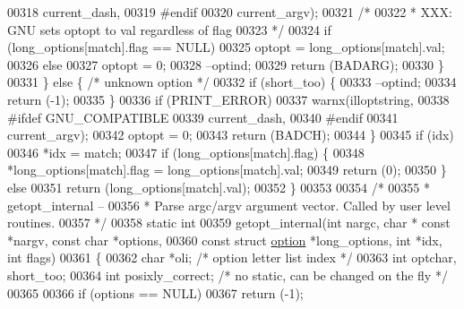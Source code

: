 \begin{DoxyCode}
{{{{{{{{{{{00318                     current\_dash,
00319 #endif
00320                     current\_argv);
00321             \textcolor{comment}{/*}
00322 \textcolor{comment}{             * XXX: GNU sets optopt to val regardless of flag}
00323 \textcolor{comment}{             */}
00324             \textcolor{keywordflow}{if} (long\_options[match].flag == NULL)
00325                 optopt = long\_options[match].val;
00326             \textcolor{keywordflow}{else}
00327                 optopt = 0;
00328             --optind;
00329             \textcolor{keywordflow}{return} (BADARG);
00330         \}
00331     \} \textcolor{keywordflow}{else} \{            \textcolor{comment}{/* unknown option */}
00332         \textcolor{keywordflow}{if} (short\_too) \{
00333             --optind;
00334             \textcolor{keywordflow}{return} (-1);
00335         \}
00336         \textcolor{keywordflow}{if} (PRINT\_ERROR)
00337             warnx(illoptstring,
00338 #ifdef GNU\_COMPATIBLE
00339                   current\_dash,
00340 #endif
00341                   current\_argv);
00342         optopt = 0;
00343         \textcolor{keywordflow}{return} (BADCH);
00344     \}
00345     \textcolor{keywordflow}{if} (idx)
00346         *idx = match;
00347     \textcolor{keywordflow}{if} (long\_options[match].flag) \{
00348         *long\_options[match].flag = long\_options[match].val;
00349         \textcolor{keywordflow}{return} (0);
00350     \} \textcolor{keywordflow}{else}
00351         \textcolor{keywordflow}{return} (long\_options[match].val);
00352 \}
00353 
00354 \textcolor{comment}{/*}
00355 \textcolor{comment}{ * getopt\_internal --}
00356 \textcolor{comment}{ *  Parse argc/argv argument vector.  Called by user level routines.}
00357 \textcolor{comment}{ */}
00358 \textcolor{keyword}{static} \textcolor{keywordtype}{int}
00359 getopt\_internal(\textcolor{keywordtype}{int} nargc, \textcolor{keywordtype}{char} * \textcolor{keyword}{const} *nargv, \textcolor{keyword}{const} \textcolor{keywordtype}{char} *options,
00360     \textcolor{keyword}{const} \textcolor{keyword}{struct} \hyperlink{structoption}{option} *long\_options, \textcolor{keywordtype}{int} *idx, \textcolor{keywordtype}{int} flags)
00361 \{
00362     \textcolor{keywordtype}{char} *oli;              \textcolor{comment}{/* option letter list index */}
00363     \textcolor{keywordtype}{int} optchar, short\_too;
00364     \textcolor{keywordtype}{int} posixly\_correct;    \textcolor{comment}{/* no static, can be changed on the fly */}
00365 
00366     \textcolor{keywordflow}{if} (options == NULL)
00367         \textcolor{keywordflow}{return} (-1);
}}}}}}}}}}}
\end{DoxyCode}
